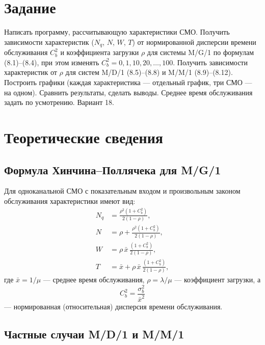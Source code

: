\documentclass[a4paper,14pt,oneside,openany]{memoir}
\begin{document}
\section*{Задание}
Написать программу, рассчитывающую характеристики СМО. Получить зависимости характеристик ($N_q$, $N$, $W$, $T$) от нормированной дисперсии времени обслуживания $C_b^2$ и коэффициента загрузки $\rho$ для системы M/G/1 по формулам (8.1)--(8.4), при этом изменять $C_b^2 = 0, 1, 10, 20, \dots, 100$. Получить зависимости характеристик от $\rho$ для систем M/D/1 (8.5)--(8.8) и M/M/1 (8.9)--(8.12). Построить графики (каждая характеристика --- отдельный график, три СМО --- на одном). Сравнить результаты, сделать выводы. Среднее время обслуживания задать по усмотрению. Вариант 18.

\section{Теоретические сведения}

\subsection{Формула Хинчина--Поллячека для M/G/1}

Для одноканальной СМО с показательным входом и произвольным законом обслуживания характеристики имеют вид:
\begin{align}
    N_q &= \frac{\rho^2 (1 + C_b^2)}{2(1-\rho)}, \label{eq:81}\\
    N   &= \rho + \frac{\rho^2 (1 + C_b^2)}{2(1-\rho)}, \label{eq:82}\\
    W   &= \rho\,\bar{x}\,\frac{(1 + C_b^2)}{2(1-\rho)}, \label{eq:83}\\
    T   &= \bar{x} + \rho\,\bar{x}\,\frac{(1 + C_b^2)}{2(1-\rho)}, \label{eq:84}
\end{align}
где $\bar{x}=1/\mu$ --- среднее время обслуживания, $\rho=\lambda/\mu$ --- коэффициент загрузки, а
\begin{equation}
    C_b^2 = \frac{\sigma_b^2}{\bar{x}^2}
\end{equation}
--- нормированная (относительная) дисперсия времени обслуживания.

\subsection{Частные случаи M/D/1 и M/M/1}
\end{document}
